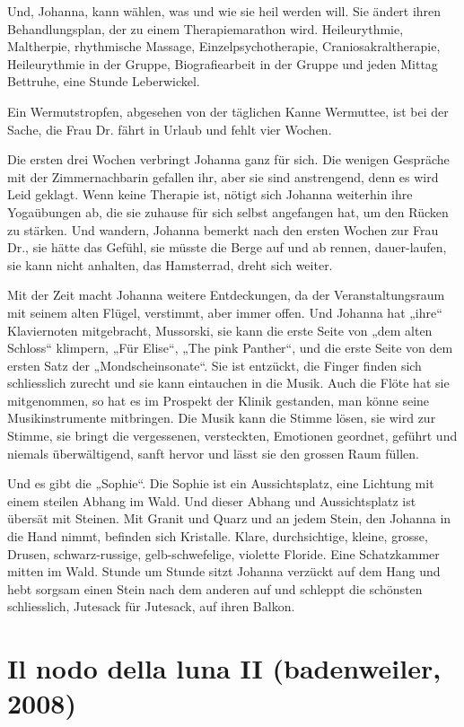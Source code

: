 \documentclass[10pt,titlepage,a5paper]{book}
\begin{document}
Und, Johanna, kann wählen, was und wie sie heil werden will. Sie ändert ihren Behandlungsplan, der zu einem Therapiemarathon wird. Heileurythmie, Maltherpie, rhythmische Massage, Einzelpsychotherapie, Craniosakraltherapie, Heileurythmie in der Gruppe, Biografiearbeit in der Gruppe und jeden Mittag Bettruhe, eine Stunde Leberwickel.

Ein Wermutstropfen, abgesehen von der täglichen Kanne Wermuttee, ist bei der Sache, die Frau Dr. fährt in Urlaub und fehlt vier Wochen. 

Die ersten drei Wochen verbringt Johanna ganz für sich. Die wenigen Gespräche mit der Zimmernachbarin gefallen ihr, aber sie sind anstrengend, denn es wird Leid geklagt. Wenn keine Therapie ist, nötigt sich Johanna weiterhin ihre Yogaübungen ab, die sie zuhause für sich selbst angefangen hat, um den Rücken zu stärken. Und wandern, Johanna bemerkt nach den ersten Wochen zur Frau Dr., sie hätte das Gefühl, sie müsste die Berge auf und ab rennen, dauer-laufen, sie kann nicht anhalten, das Hamsterrad, dreht sich weiter.

Mit der Zeit macht Johanna weitere Entdeckungen, da der Veranstaltungsraum mit seinem alten Flügel, verstimmt, aber immer offen. Und Johanna hat „ihre“ Klaviernoten mitgebracht, Mussorski, sie kann die erste Seite von „dem alten Schloss“ klimpern, „Für Elise“, „The pink Panther“, und die erste Seite von dem ersten Satz der „Mondscheinsonate“. Sie ist entzückt, die Finger finden sich schliesslich zurecht und sie kann eintauchen in die Musik. Auch die Flöte hat sie mitgenommen, so hat es im Prospekt der Klinik gestanden, man könne seine Musikinstrumente mitbringen. Die Musik kann die Stimme lösen, sie wird zur Stimme, sie bringt die vergessenen, versteckten, Emotionen geordnet, geführt und niemals überwältigend, sanft hervor und lässt sie den grossen Raum füllen.

Und es gibt die „Sophie“. Die Sophie ist ein Aussichtsplatz, eine Lichtung mit einem steilen Abhang im Wald. Und dieser Abhang und Aussichtsplatz ist übersät mit Steinen. Mit Granit und Quarz und an jedem Stein, den Johanna in die Hand nimmt, befinden sich Kristalle. Klare, durchsichtige, kleine, grosse, Drusen, schwarz-russige, gelb-schwefelige, violette Floride. Eine Schatzkammer mitten im Wald. Stunde um Stunde sitzt Johanna verzückt auf dem Hang und hebt sorgsam einen Stein nach dem anderen auf und schleppt die schönsten schliesslich, Jutesack für Jutesack, auf ihren Balkon.



\section*{Il nodo della luna II (badenweiler, 2008)}
\end{document}
